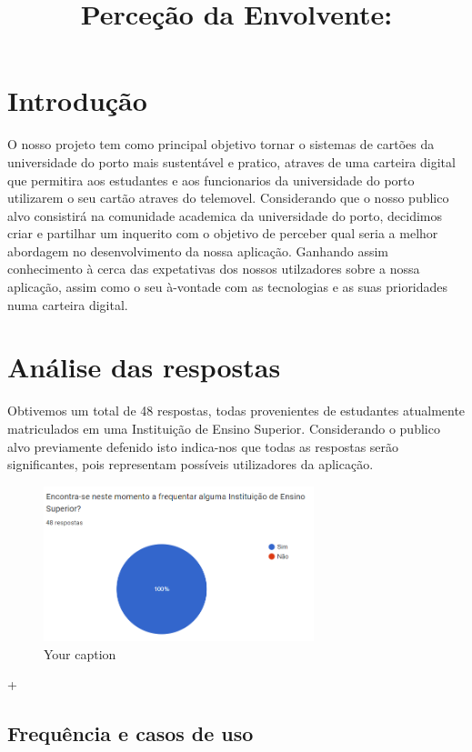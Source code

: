 \documentclass{article}
\begin{document}
\title{Perceção da Envolvente:}
\maketitle

\section{Introdução}

O nosso projeto tem como principal objetivo tornar o sistemas de cartões da universidade do porto mais sustentável e pratico, atraves de uma carteira digital que permitira aos estudantes e aos funcionarios da universidade do porto utilizarem o seu cartão atraves do telemovel.
Considerando que o nosso publico alvo consistirá na comunidade academica da universidade do porto, decidimos criar e partilhar um inquerito com o objetivo de perceber qual seria a melhor abordagem no desenvolvimento da nossa aplicação.
Ganhando assim conhecimento à cerca das expetativas dos nossos utilzadores sobre a nossa aplicação, assim como o seu à-vontade com as tecnologias e as suas prioridades numa carteira digital.

\section{Análise das respostas}


Obtivemos um total de 48 respostas, todas provenientes de estudantes atualmente matriculados em uma Instituição de Ensino Superior. Considerando o publico alvo previamente defenido isto indica-nos que todas as respostas serão significantes, pois representam possíveis utilizadores da aplicação.

\begin{figure}[h]
    \centering
    \includegraphics[width=0.7\textwidth]{images/questionaire1.png}
    \caption{Your caption}
\end{figure}


+
\subsection{Frequência e casos de uso}
\end{document}

